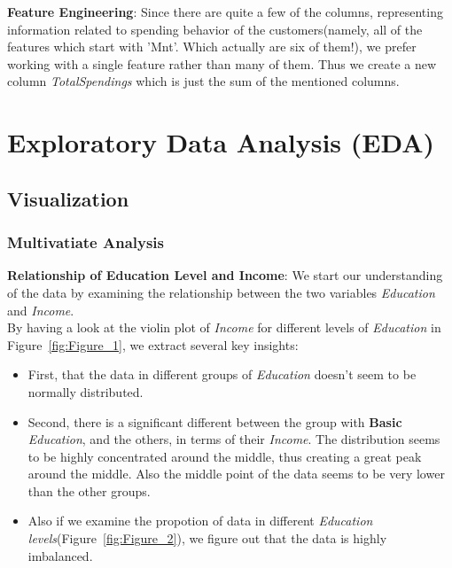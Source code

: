 \documentclass[a4paper,12pt]{article}
\begin{document}
\noindent \textbf{Feature Engineering}: Since there are quite a few of the columns, representing information related to spending behavior of the customers(namely, all of the features which start with 'Mnt'. Which actually are six of them!), 
we prefer working with a single feature rather than many of them. Thus we create a new column \textit{TotalSpendings} which is just the sum of the mentioned columns. \\ 


\section*{Exploratory Data Analysis (EDA)}
\subsection*{Visualization}
\subsubsection*{Multivatiate Analysis}
\noindent \textbf{Relationship of Education Level and Income}: 
We start our understanding of the data by examining the relationship between the two variables \textit{Education} and  \textit{Income}. \\
By having a look at the violin plot of \textit{Income} for different levels of \textit{Education} in Figure~\ref{fig:Figure_1}, we extract several key insights:
\begin{itemize}
    \item First, that the data in different groups of \textit{Education} doesn't seem to be normally distributed.
    \item Second, there is a significant different between the group with \textbf{Basic} \textit{Education}, and the others, in terms of their \textit{Income}. The distribution seems to be highly concentrated around the middle, 
    thus creating a great peak around the middle. Also the middle point of the data seems to be very lower than the other groups.
    \item Also if we examine the propotion of data in different \textit{Education levels}(Figure~\ref{fig:Figure_2}), we figure out that the data is highly imbalanced.
\end{itemize} 
\end{document}
